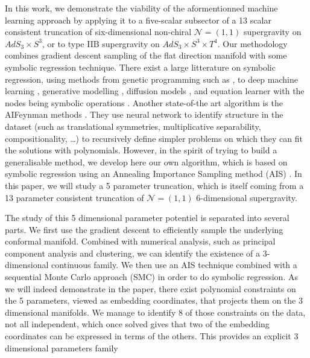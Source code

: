 \documentclass[11pt,a4paper]{article}
\begin{document}
In this work, we demonstrate the viability of the aformentionned machine learning approach by applying it to a five-scalar subsector of a 13 scalar consistent truncation of six-dimensional non-chiral $\mathcal{N} = (1,1)$ supergravity on $AdS_3 \times S^3$, or to type IIB supergravity on $AdS_3 \times S^3 \times T^4$. Our methodology combines gradient descent sampling of the flat direction manifold with some symbolic regression technique. There exist a large litterature on symbolic regression, using methods from genetic programming \cite{koza1994genetic} such as \cite{virgolin2021improving,randall2022bingo,burlacu2019parsimony}, to deep machine learning \cite{petersen2019deep,kamienny2022end}, generative modelling \cite{valipour2021symbolicgpt}, diffusion models \cite{bastiani2025diffusion}, and equation learner with the nodes being symbolic operations \cite{2018arXiv180607259S}. Another state-of-the art algorithm is the AIFeynman methods \cite{Udrescu:2019mnk}. They use neural network to identify structure in the dataset (such as translational symmetries, multiplicative separability, compositionality, \dots) to recursively define simpler problems on which they can fit the solutions with polynomials.  However, in the spirit of trying to build a generalisable method, we develop here our own algorithm, which is based on symbolic regression using an Annealing Importance Sampling method (AIS) \cite{neal1998annealedimportancesampling}. In this paper, we will study a 5 parameter truncation, which is itself coming from a 13 parameter consistent truncation of $\mathcal{N} = (1,1)$ 6-dimensional supergravity. 

The study of this 5 dimensional parameter potentiel is separated into several parts. We first use the gradient descent to efficiently sample the underlying conformal manifold. Combined with numerical analysis, such as principal component analysis and clustering, we can identify the existence of a 3-dimensional continuous family. We then use an AIS technique combined with a sequential Monte Carlo approach (SMC) \cite{del2006sequential} in order to do symbolic regression. As we will indeed demonstrate in the paper, there exist polynomial constraints on the 5 parameters, viewed as embedding coordinates, that projects them on the 3 dimensional manifolds. We manage to identify 8 of those constraints on the data, not all independent, which once solved gives that two of the embedding coordinates can be expressed in terms of the others. This provides an explicit 3 dimensional parameters family 
\end{document}
